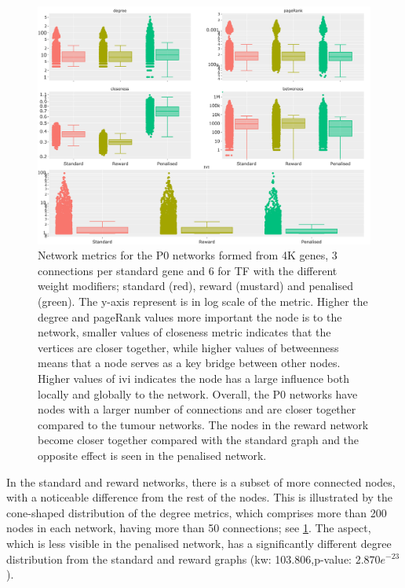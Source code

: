 \begin{figure}[!t]    
    \centering
    \includegraphics[width=1.0\textwidth,keepaspectratio]{Sections/Network_I/Resources/P0/P0_NetworkMetricsComp_50TF_2.png}
     \caption[P0: centrality network metrics]{Network metrics for the P0 networks formed from 4K genes, 3 connections per standard gene and 6 for TF with the different weight modifiers; standard (red), reward (mustard) and penalised (green). The y-axis represent is in log scale of the metric. Higher the degree and pageRank values more important the node is to the network, smaller values of closeness metric indicates that the vertices are closer together, while higher values of betweenness means that a node serves as a key bridge between other nodes. Higher values of \acrlong{ivi} indicates the node has a large influence both locally and globally to the network. Overall, the P0 networks have nodes with a larger number of connections and are closer together compared to the tumour networks. The nodes in the reward network become closer together compared with the standard graph and the opposite effect is seen in the penalised network. }
    \label{fig:N_I:net_metrics_p0}
\end{figure}


In the standard and reward networks, there is a subset of more connected nodes, with a noticeable difference from the rest of the nodes. This is illustrated by the cone-shaped distribution of the degree metrics, which comprises more than 200 nodes in each network, having more than 50 connections; see \cref{fig:N_I:net_metrics_p0}. The aspect, which is less visible in the penalised network, has a significantly different degree distribution from the standard and reward graphs (\acrshort{kw}: 103.806,p-value: $2.870e^{-23}$).

